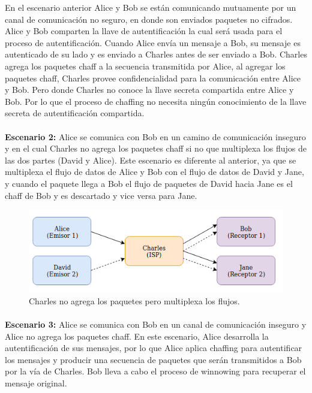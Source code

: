 \documentclass[12pt, a4paper, titlepage]{report}
\begin{document}
		En el escenario anterior Alice y Bob se están comunicando mutuamente por un canal de comunicación no seguro, en donde son enviados paquetes no cifrados. Alice y Bob comparten la llave de autentificación la cual será usada para el proceso de autentificación. Cuando Alice envía un mensaje a Bob, su mensaje es autenticado de su lado y es enviado a Charles antes de ser enviado a Bob. Charles agrega los paquetes chaff a la secuencia transmitida por Alice, al agregar los paquetes chaff, Charles provee confidencialidad para la comunicación entre Alice y Bob. Pero donde Charles no conoce la llave secreta compartida entre Alice y Bob. Por lo que el proceso de chaffing no necesita ningún conocimiento de la llave secreta de autentificación compartida.
		\paragraph{}
		\textbf{Escenario 2:} Alice se comunica con Bob en un camino de comunicación inseguro y en el cual Charles no agrega los paquetes chaff si no que multiplexa los flujos de las dos partes (David y Alice). Este escenario es diferente al anterior, ya que se multiplexa el flujo de datos de Alice y Bob con el flujo de datos de David y Jane, y cuando el paquete llega a Bob el flujo de paquetes de David hacia Jane es el chaff de Bob y es descartado y vice versa para Jane.
		
		\begin{figure}[H]
			\begin{center}	                  \includegraphics[width=14cm]{./imagenes/MarcoTeorico/escenario2.png}
				\caption{Charles no agrega los paquetes pero multiplexa los flujos.}
			\end{center}
		\end{figure}
		
		\paragraph{}
		\textbf{Escenario 3:} Alice se comunica con Bob en un canal de comunicación inseguro y Alice no agrega los paquetes chaff. En este escenario, Alice desarrolla la autentificación de sus mensajes, por lo que Alice aplica chaffing para autentificar los mensajes y producir una secuencia de paquetes que serán transmitidos a Bob por la vía de Charles. Bob lleva a cabo el proceso de winnowing para recuperar el mensaje original.
		
\end{document}
